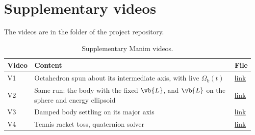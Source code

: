 \appendix

\section{Supplementary videos}
\label{app:videos}
The videos are in the \href{\repourl/tree/main/videos}{} folder of the project repository.
\begin{table}[H]
    \centering
    \caption{Supplementary Manim videos.}
    \label{tab:videos}
    \small
    \begin{tabularx}{\columnwidth}{@{}l L l@{}}
        \toprule
        Video & Content & File \\
        \midrule
        V1 & Octahedron spun about its intermediate axis, with live $\Omega_k(t)$ & \href{\repourl/blob/main/videos/spin_middle_axis.mp4}{link} \\
        V2 & Same run: the body with the fixed $\vb{L}$, and $\vb{L}$ on the sphere and energy ellipsoid & \href{\repourl/blob/main/videos/polhode.mp4}{link} \\
        V3 & Damped body settling on its major axis & \href{\repourl/blob/main/videos/major_axis.mp4}{link} \\
        V4 & Tennis racket toss, quaternion solver & \href{\repourl/blob/main/videos/racket_toss.mp4}{link} \\
        \bottomrule
    \end{tabularx}
\end{table}
